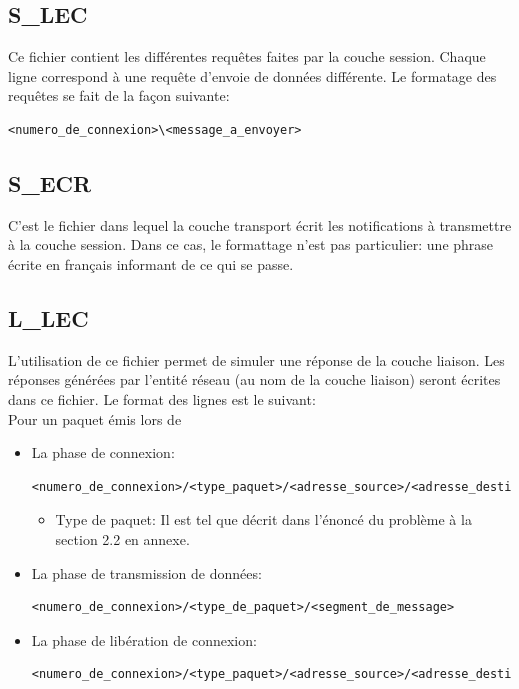 \documentclass[11pt,french]{article}
\begin{document}
        \subsection{S\_LEC} %
        \label{sub:slec}
            Ce fichier contient les différentes requêtes faites par la couche session. Chaque ligne correspond à une requête d'envoie de données
            différente. Le formatage des requêtes se fait de la façon suivante:
            \begin{lstlisting}
<numero_de_connexion>\<message_a_envoyer>
            \end{lstlisting}
        \subsection{S\_ECR} %
        \label{sub:secr}
            C'est le fichier dans lequel la couche transport écrit les notifications à transmettre à la couche session. Dans ce cas, le formattage
            n'est pas particulier: une phrase écrite en français informant de ce qui se passe.
        \subsection{L\_LEC} %
        \label{sub:llec}
            L'utilisation de ce fichier permet de simuler une réponse de la couche liaison. Les réponses générées par l'entité réseau (au nom
            de la couche liaison) seront écrites dans ce fichier. Le format des lignes est le suivant:\\

            Pour un paquet émis lors de
            \begin{itemize}
                \item La phase de connexion:
\begin{lstlisting}
<numero_de_connexion>/<type_paquet>/<adresse_source>/<adresse_destination>
\end{lstlisting}
                    
                    \begin{itemize}
                        \item Type de paquet: Il est tel que décrit dans l'énoncé du problème à la section 2.2 en annexe.
                    \end{itemize}
                \item La phase de transmission de données:
\begin{lstlisting}
<numero_de_connexion>/<type_de_paquet>/<segment_de_message>
\end{lstlisting}
                \item La phase de libération de connexion:
\begin{lstlisting}
<numero_de_connexion>/<type_paquet>/<adresse_source>/<adresse_destination>
\end{lstlisting}
            \end{itemize}
\end{document}

